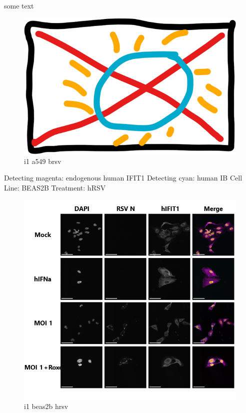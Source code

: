 some text

\begin{figure}
    \centering
    \includegraphics[width=0.5\linewidth]{06. Chapter 1//Figs/00. placeholder.png}
    \caption[i1 a549 brsv]{i1 a549 brsv}
    \label{i1 a549 brsv}
\end{figure}

Detecting magenta: endogenous human IFIT1 \newline
Detecting cyan: human IB \newline
Cell Line: BEAS2B \newline
Treatment: hRSV \newline

\begin{figure}
    \centering
    \includegraphics[width=1\linewidth]{08. Chapter 3/Figs/02. IFIT1/05. beas2b hrsv.png}
    \caption[i1 beas2b hrsv]{i1 beas2b hrsv}
    \label{i1 beas2b hrsv}
\end{figure}

